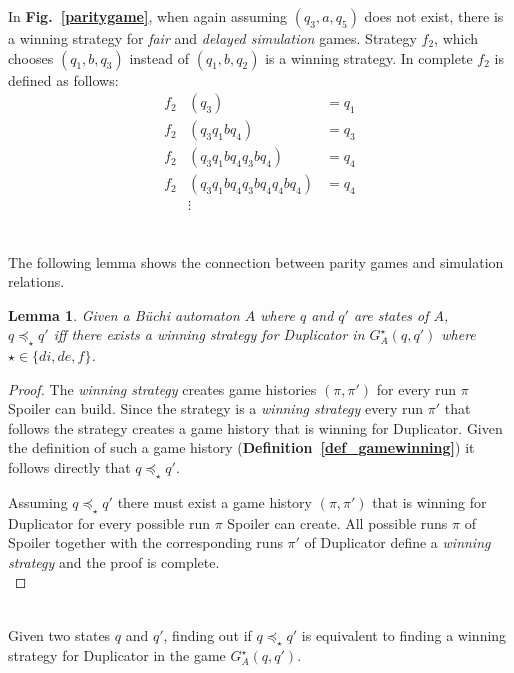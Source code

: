 \documentclass[12pt,oneside,bibliography=totoc,abstracton]{scrartcl}
\newcommand{\figref}[1]{\textbf{Fig.~\ref{#1}}}
\newcommand{\defref}[1]{\textbf{Definition~\ref{#1}}}
\newtheorem{mylemma}{Lemma}
\begin{document}
In \figref{paritygame}, when again assuming $(q_3, a, q_5)$ does not exist, there is a winning strategy
for \textit{fair} and \textit{delayed simulation} games. Strategy $f_2$, which chooses $(q_1, b, q_3)$ instead of $(q_1, b, q_2)$
is a winning strategy. In complete $f_2$ is defined as follows:
\begin{align*}
	f_2	&(q_3)				&= q_1\\
	f_2	&(q_3q_1bq_4)			&= q_3\\
	f_2	&(q_3q_1bq_4q_3bq_4)		&= q_4\\
	f_2	&(q_3q_1bq_4q_3bq_4q_4bq_4)	&= q_4\\
		&\vdots
\end{align*}\\\\
The following lemma shows the connection between parity games and simulation relations.
\begin{mylemma}\label{lemma_parity_game}
	Given a Büchi automaton $A$ where $q$ and $q'$ are states of $A$,\\
	$q \preceq_{\star} q'$ iff there exists a winning strategy for Duplicator in $G^{\star}_A(q, q')$ where $\star \in \{di, de, f\}$.
\end{mylemma}
\begin{proof}
	The \textit{winning strategy} creates game histories $(\pi, \pi')$ for every run $\pi$ Spoiler can build.
	Since the strategy is a \textit{winning strategy} every run $\pi'$ that follows the strategy creates a game
	history that is winning for Duplicator. Given the definition of such a game history
	(\defref{def_gamewinning}) it follows directly that $q \preceq_{\star} q'$.
	
	Assuming $q \preceq_{\star} q'$ there must exist a game history $(\pi, \pi')$ that is winning for Duplicator for
	every possible run $\pi$ Spoiler can create.
	All possible runs $\pi$ of Spoiler together with the corresponding runs $\pi'$ of Duplicator define
	a \textit{winning strategy} and the proof is complete.\\
\end{proof}\quad\\
Given two states $q$ and $q'$, finding out if $q \preceq_{\star} q'$ is equivalent to finding a winning
strategy for Duplicator in the game $G^{\star}_A(q, q')$.

\end{document}
